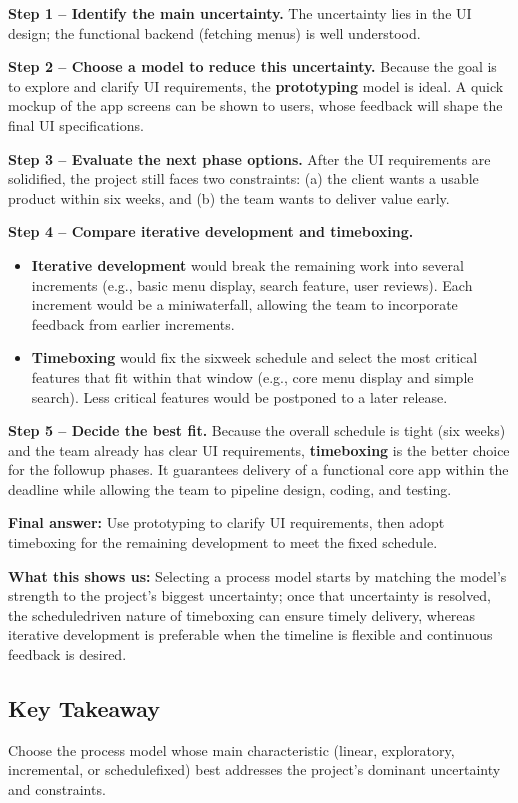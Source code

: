 \documentclass[12pt, a4paper]{article}
\begin{document}
\textbf{Step 1 -- Identify the main uncertainty.}  
The uncertainty lies in the UI design; the functional backend (fetching menus) is well understood.

\textbf{Step 2 -- Choose a model to reduce this uncertainty.}  
Because the goal is to explore and clarify UI requirements, the \textbf{prototyping} model is ideal.  A quick mockup of the app screens can be shown to users, whose feedback will shape the final UI specifications.

\textbf{Step 3 -- Evaluate the next phase options.}  
After the UI requirements are solidified, the project still faces two constraints: (a) the client wants a usable product within six weeks, and (b) the team wants to deliver value early.

\textbf{Step 4 -- Compare iterative development and timeboxing.}  
\begin{itemize}
  \item \textbf{Iterative development} would break the remaining work into several increments (e.g., basic menu display, search feature, user reviews).  Each increment would be a miniwaterfall, allowing the team to incorporate feedback from earlier increments.
  \item \textbf{Timeboxing} would fix the sixweek schedule and select the most critical features that fit within that window (e.g., core menu display and simple search).  Less critical features would be postponed to a later release.
\end{itemize}

\textbf{Step 5 -- Decide the best fit.}  
Because the overall schedule is tight (six weeks) and the team already has clear UI requirements, \textbf{timeboxing} is the better choice for the followup phases.  It guarantees delivery of a functional core app within the deadline while allowing the team to pipeline design, coding, and testing.

\textbf{Final answer:} Use prototyping to clarify UI requirements, then adopt timeboxing for the remaining development to meet the fixed schedule.

\textbf{What this shows us:} Selecting a process model starts by matching the model's strength to the project's biggest uncertainty; once that uncertainty is resolved, the scheduledriven nature of timeboxing can ensure timely delivery, whereas iterative development is preferable when the timeline is flexible and continuous feedback is desired.

\subsection{Key Takeaway}
Choose the process model whose main characteristic (linear, exploratory, incremental, or schedulefixed) best addresses the project's dominant uncertainty and constraints.
\end{document}

